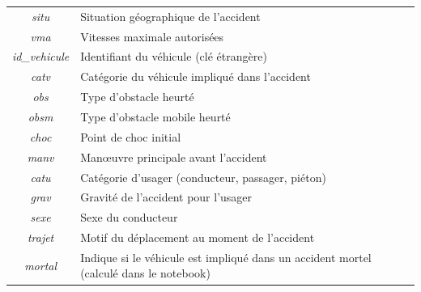 \documentclass{article}
\begin{document}
\begin{center}
\begin{tabular}{ |c|p{9cm}| }
            \textit{situ} & Situation géographique de l'accident \\
            \textit{vma} & Vitesses maximale autorisées \\
            \textit{id\_vehicule} & Identifiant du véhicule (clé étrangère) \\
            \textit{catv} & Catégorie du véhicule impliqué dans l'accident \\
            \textit{obs} & Type d'obstacle heurté \\
            \textit{obsm} & Type d'obstacle mobile heurté \\
            \textit{choc} & Point de choc initial \\
            \textit{manv} & Manœuvre principale avant l'accident \\
            \textit{catu} & Catégorie d'usager (conducteur, passager, piéton) \\
            \textit{grav} & Gravité de l'accident pour l'usager \\
            \textit{sexe} & Sexe du conducteur \\
            \textit{trajet} & Motif du déplacement au moment de l'accident \\
            \textit{mortal} & Indique si le véhicule est impliqué dans un accident mortel (calculé dans le notebook) \\
            \hline
        \end{tabular}
    \end{center}
    \newpage
\end{document}
